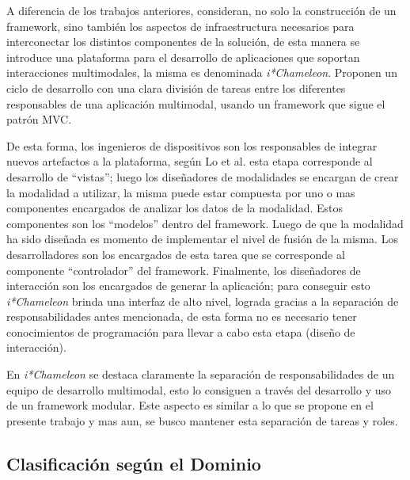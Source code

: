 A diferencia de los trabajos anteriores, \citet*{lo2013chameleon} consideran, no solo la construcción de un framework, sino también los aspectos de infraestructura necesarios para interconectar los distintos componentes de la solución, de esta manera se introduce una \textsf{plataforma} para el desarrollo de aplicaciones que soportan interacciones multimodales, la misma es denominada \emph{i*Chameleon}. Proponen un ciclo de desarrollo con una clara división de tareas entre los diferentes responsables de una aplicación multimodal, usando un framework que sigue el patrón MVC. 

De esta forma, los ingenieros de dispositivos son los responsables de integrar nuevos artefactos a la plataforma, según Lo et al. esta etapa corresponde al desarrollo de ``vistas''; luego los diseñadores de modalidades se encargan de crear la modalidad a utilizar, la misma puede estar compuesta por uno o mas componentes encargados de analizar los datos de la modalidad. Estos componentes son los ``modelos'' dentro del framework. Luego de que la modalidad ha sido diseñada es momento de implementar el nivel de fusión de la misma. Los desarrolladores son los encargados de esta tarea que se corresponde al componente ``controlador'' del framework. Finalmente, los diseñadores de interacción son los encargados de generar la aplicación; para conseguir esto \emph{i*Chameleon} brinda una interfaz de alto nivel, lograda gracias a la separación de responsabilidades antes mencionada, de esta forma no es necesario tener conocimientos de programación para llevar a cabo esta etapa (diseño de interacción).

En \emph{i*Chameleon} se destaca claramente la separación de responsabilidades de un equipo de desarrollo multimodal, esto lo consiguen a través del desarrollo y uso de un framework modular. Este aspecto es similar a lo que se propone en el presente trabajo y mas aun, se busco mantener esta separación de tareas y roles.


\subsection{Clasificación según el Dominio}

